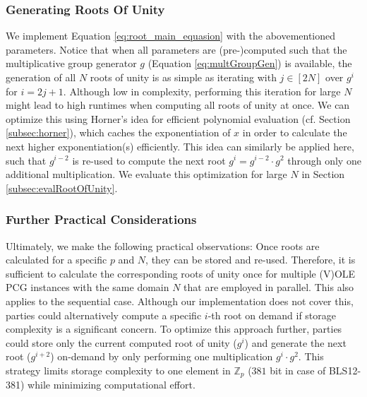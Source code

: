 \subsubsection{Generating Roots Of Unity}
We implement Equation \ref{eq:root_main_equasion} with the abovementioned parameters. Notice that when all parameters are (pre-)computed such that the multiplicative group generator $g$ (Equation \ref{eq:multGroupGen}) is available, the generation of all $N$ roots of unity is as simple as iterating with $j\in[2N]$ over $g^i$ for $i=2j+1$. Although low in complexity, performing this iteration for large $N$ might lead to high runtimes when computing all roots of unity at once. We can optimize this using Horner's idea for efficient polynomial evaluation (cf. Section \ref{subsec:horner}), which caches the exponentiation of $x$ in order to calculate the next higher exponentiation(s) efficiently. This idea can similarly be applied here, such that $g^{i-2}$ is re-used to compute the next root $g^i= g^{i-2}\cdot g^2$ through only one additional multiplication. We evaluate this optimization for large $N$ in Section \ref{subsec:evalRootOfUnity}.

\subsubsection{Further Practical Considerations}
Ultimately, we make the following practical observations: Once roots are calculated for a specific $p$ and $N$, they can be stored and re-used. Therefore, it is sufficient to calculate the corresponding roots of unity once for multiple (V)OLE PCG instances with the same domain $N$ that are employed in parallel. This also applies to the sequential case. Although our implementation does not cover this, parties could alternatively compute a specific $i$-th root on demand if storage complexity is a significant concern. To optimize this approach further, parties could store only the current computed root of unity ($g^i$) and generate the next root ($g^{i+2}$) on-demand by only performing one multiplication $g^i\cdot g^2$. This strategy limits storage complexity to one element in $\mathbb{Z}_p$ ($381$ bit in case of BLS12-381) while minimizing computational effort. 